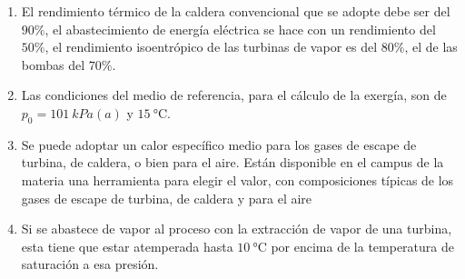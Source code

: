 \begin{enumerate}
    \item El rendimiento térmico de la caldera convencional que se adopte debe ser del $90\%$, el abastecimiento de energía eléctrica se hace con un rendimiento del $50\%$, el rendimiento isoentrópico de las turbinas de vapor es del $80\%$, el de las bombas del $70\%$.
    \item Las condiciones del medio de referencia, para el cálculo de la exergía, son de $p_0=\SI{101}{kPa(a)}$ y $\SI{15}{\celsius}$.
    \item Se puede adoptar un calor específico medio para los gases de escape de turbina, de caldera, o bien para el aire. Están disponible en el campus de la materia una herramienta para elegir el valor, con composiciones típicas de los gases de escape de turbina, de caldera y para el aire
    \item Si se abastece de vapor al proceso con la extracción de vapor de una turbina, esta tiene que estar atemperada hasta $\SI{10}{\celsius}$ por encima de la temperatura de saturación a esa presión.
\end{enumerate}






    
    
    
    
    
    
    
    



